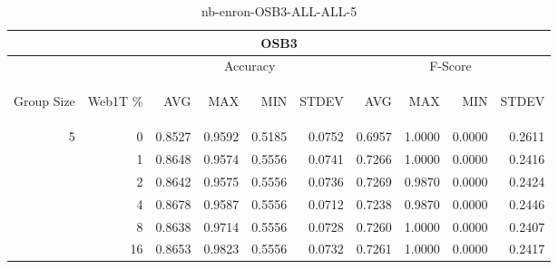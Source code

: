 \begin{center}
\begin{table}[htbp]
\begin{tabular}{ | r | r | r | r | r | r | r | r | r | r |}
\hline
\multicolumn{10}{|c|}{OSB3}\\
\hline
 & & \multicolumn{4}{|c|}{Accuracy} & \multicolumn{4}{|c|}{F-Score}\\ \cline{3-10}
\begin{sideways}Group Size\end{sideways} & \begin{sideways}Web1T \%\end{sideways} & \begin{sideways}AVG\end{sideways} & \begin{sideways}MAX\end{sideways} & \begin{sideways}MIN\end{sideways} & \begin{sideways}STDEV\end{sideways} & \begin{sideways}AVG\end{sideways} & \begin{sideways}MAX\end{sideways} & \begin{sideways}MIN\end{sideways} & \begin{sideways}STDEV\end{sideways}\\
\hline
\multirow{6}{*}{5}
 & 0 & 0.8527 & 0.9592 & 0.5185 & 0.0752 & 0.6957 & 1.0000 & 0.0000 & 0.2611\\ \cline{2-10}
 & 1 & 0.8648 & 0.9574 & 0.5556 & 0.0741 & 0.7266 & 1.0000 & 0.0000 & 0.2416\\ \cline{2-10}
 & 2 & 0.8642 & 0.9575 & 0.5556 & 0.0736 & 0.7269 & 0.9870 & 0.0000 & 0.2424\\ \cline{2-10}
 & 4 & 0.8678 & 0.9587 & 0.5556 & 0.0712 & 0.7238 & 0.9870 & 0.0000 & 0.2446\\ \cline{2-10}
 & 8 & 0.8638 & 0.9714 & 0.5556 & 0.0728 & 0.7260 & 1.0000 & 0.0000 & 0.2407\\ \cline{2-10}
 & 16 & 0.8653 & 0.9823 & 0.5556 & 0.0732 & 0.7261 & 1.0000 & 0.0000 & 0.2417\\ \cline{2-10}
\hline
\end{tabular}
\caption{nb-enron-OSB3-ALL-ALL-5}
\end{table}
\end{center}

